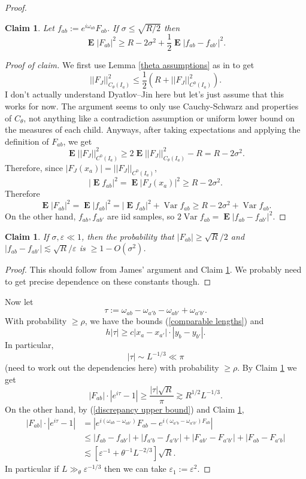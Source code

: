 \documentclass[reqno,10pt]{amsart}
\DeclareMathOperator*{\Expect}{\mathbf E}
\DeclareMathOperator{\Var}{Var}
\newtheorem{claim}[theorem]{Claim}
\theoremstyle{definition}
\numberwithin{equation}{section}
\begin{document}
\begin{proof}
\begin{claim}\label{variance and iids claim}
Let $f_{ab} := e^{i\omega_{ab}} F_{ab}$. If $\sigma \leq \sqrt{R/2}$ then
$$\Expect |F_{ab}|^2 \geq R - 2\sigma^2 + \frac{1}{2} \Expect |f_{ab} - f_{ab'}|^2.$$
\end{claim}
\begin{proof}[Proof of claim]
We first use Lemma \ref{theta assumptions} as in \cite[Lemma 3.5]{Dyatlov_2018} to get
$$||F_J||_{C_\theta(I_a)}^2 \leq \frac{1}{2} \left(R + ||F_J||_{C^0(I_a)}^2\right).$$
I don't actually understand Dyatlov--Jin here but let's just assume that this works for now.
The argument seems to only use Cauchy-Schwarz and properties of $C_\theta$, not anything like a contradiction assumption or uniform lower bound on the measures of each child.
Anyways, after taking expectations and applying the definition of $F_{ab}$, we get 
$$\Expect ||F_J||_{C^0(I_a)}^2 \geq 2 \Expect ||F_J||_{C_\theta(I_a)}^2 - R = R - 2\sigma^2.$$
Therefore, since $|F_J(x_a)| = ||F_J||_{C^0(I_a)}$,
$$|\Expect f_{ab}|^2 = \Expect |F_J(x_a)|^2 \geq R - 2\sigma^2.$$
Therefore 
$$\Expect |F_{ab}|^2 = \Expect |f_{ab}|^2 = |\Expect f_{ab}|^2 + \Var f_{ab} \geq R - 2\sigma^2 + \Var f_{ab}.$$
On the other hand, $f_{ab}, f_{ab'}$ are iid samples, so $2\Var f_{ab} = \Expect |f_{ab} - f_{ab'}|^2$.
\end{proof}

\begin{claim}\label{Fab lower bound}
If $\sigma, \varepsilon \ll 1$, then the probability that $|F_{ab}| \geq \sqrt R/2$ and $|f_{ab} - f_{ab'}| \lesssim \sqrt R/\varepsilon$ is $\geq 1 - O(\sigma^2)$.
\end{claim}
\begin{proof}
This should follow from James' argument and Claim \ref{variance and iids claim}. We probably need to get precise dependence on these constants though.
\end{proof}

Now let
$$\tau := \omega_{ab} - \omega_{a'b} - \omega_{ab'} + \omega_{a'b'}.$$
With probability $\geq \rho$, we have the bounds (\ref{comparable lengths}) and
$$h |\tau| \geq c|x_a - x_{a'}| \cdot |y_b - y_{b'}|.$$
In particular, 
$$|\tau| \sim L^{-1/3} \ll \pi$$
(need to work out the dependencies here) with probability $\geq \rho$.
By Claim \ref{Fab lower bound} we get
$$|F_{ab}| \cdot |e^{i\tau} - 1| \geq \frac{|\tau| \sqrt R}{\pi} \gtrsim R^{1/2} L^{-1/3}.$$
On the other hand, by (\ref{discrepancy upper bound}) and Claim \ref{Fab lower bound},
\begin{align*}
|F_{ab}| \cdot |e^{i\tau} - 1| &= |e^{i(\omega_{ab} - \omega_{ab'})} F_{ab} - e^{i(\omega_{a' b} - \omega_{a' b'}) F_{ab}}| \\
&\leq |f_{ab} - f_{ab'}| + |f_{a' b} - f_{a' b'}| + |F_{ab'} - F_{a'b'}| + |F_{ab} - F_{a' b}| \\
&\lesssim \left[\varepsilon^{-1} + \theta^{-1} L^{-2/3}\right] \sqrt R.
\end{align*}
In particular if $L \gg_\theta \varepsilon^{-1/3}$ then we can take $\varepsilon_1 := \varepsilon^2$.
\end{proof}



\printbibliography
\end{document}
